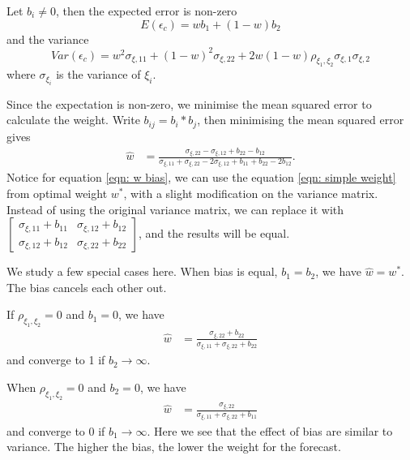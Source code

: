 \documentclass[11pt]{article}
\begin{document}
Let $b_i \neq 0$, then the expected error is non-zero
\begin{equation}
E(\epsilon_c) = wb_1+(1-w)b_2
\end{equation}
and the variance
\begin{equation}
Var(\epsilon_c) = w^2\sigma_{\xi,11} + (1-w)^2\sigma_{\xi,22} + 2w(1-w)\rho_{\xi_1,\xi_2}\sigma_{\xi,1}\sigma_{\xi,2}
\end{equation}
where $\sigma_{\xi_i}$ is the variance of $\xi_i$.

Since the expectation is non-zero, we minimise the mean squared error to calculate the weight.
Write \(b_{ij}=b_i*b_j\), then minimising the mean squared error gives
\begin{equation}
\label{eqn: w bias}
\begin{aligned}
\hat{w} &= \frac{\sigma_{\xi,22}-\sigma_{\xi,12}+b_{22}-b_{12}}{\sigma_{\xi,11}+\sigma_{\xi,22}-2\sigma_{\xi,12}+b_{11}+b_{22}-2b_{12}}.
\end{aligned}
\end{equation}
Notice for equation \ref{eqn: w bias}, we can use the equation \ref{eqn: simple weight} from optimal weight $w^*$, with a slight modification on the variance matrix. Instead of using the original variance matrix, we can replace it with
\(\begin{bmatrix}\sigma_{\xi,11}+b_{11} & \sigma_{\xi,12}+b_{12}\\ \sigma_{\xi,12}+b_{12} & \sigma_{\xi,22}+b_{22}\end{bmatrix}\), and the results will be equal.

We study a few special cases here. When bias is equal, $b_1=b_2$, we have $\hat{w}=w^*$. The bias cancels each other out. 

If $\rho_{\xi_1,\xi_2}=0$ and $b_1=0$, we have
\begin{equation}
\begin{aligned}
\hat{w} &= \frac{\sigma_{\xi,22}+b_{22}}{\sigma_{\xi,11}+\sigma_{\xi,22}+b_{22}}
\end{aligned}
\end{equation}
and converge to 1 if $b_2 \to \infty$.

When $\rho_{\xi_1,\xi_2}=0$ and $b_2=0$, we have
\begin{equation}
\begin{aligned}
\hat{w} &= \frac{\sigma_{\xi,22}}{\sigma_{\xi,11}+\sigma_{\xi,22}+b_{11}}
\end{aligned}
\end{equation}
and converge to 0 if $b_1 \to \infty$. Here we see that the effect of bias are similar to variance. The higher the bias, the lower the weight for the forecast.
\end{document}
